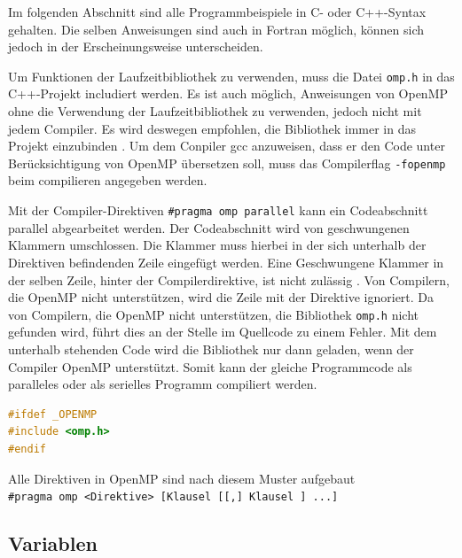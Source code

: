 \documentclass[../main.tex]{subfiles}
\begin{document}
Im folgenden Abschnitt sind alle Programmbeispiele in C- oder C++-Syntax gehalten. Die selben Anweisungen sind auch in Fortran möglich, können sich jedoch in der Erscheinungsweise unterscheiden.

Um Funktionen der Laufzeitbibliothek zu verwenden, muss die Datei \texttt{omp.h} in das C++-Projekt includiert werden. Es ist auch möglich, Anweisungen von OpenMP ohne die Verwendung der Laufzeitbibliothek zu verwenden, jedoch nicht mit jedem Compiler. Es wird deswegen empfohlen, die Bibliothek immer in das Projekt einzubinden \cite{articleOpenMP}. Um dem Conpiler gcc anzuweisen, dass er den Code unter Berücksichtigung von OpenMP übersetzen soll, muss das Compilerflag \texttt{-fopenmp} beim compilieren angegeben werden. \par
Mit der Compiler-Direktiven \texttt{\#pragma\ omp\ parallel} kann ein Codeabschnitt parallel abgearbeitet werden. Der Codeabschnitt wird von geschwungenen Klammern umschlossen. Die Klammer muss hierbei in der sich unterhalb der Direktiven befindenden Zeile eingefügt werden. Eine Geschwungene Klammer in der selben Zeile, hinter der Compilerdirektive, ist nicht zulässig \cite{articleOpenMP}. Von Compilern, die OpenMP nicht unterstützen, wird die Zeile mit der Direktive ignoriert. Da von Compilern, die OpenMP nicht unterstützen, die Bibliothek \texttt{omp.h} nicht gefunden wird, führt dies an der Stelle im Quellcode zu einem Fehler. Mit dem unterhalb stehenden Code wird die Bibliothek nur dann geladen, wenn der Compiler OpenMP unterstützt. Somit kann der gleiche Programmcode als paralleles oder als serielles Programm compiliert werden.
\begin{lstlisting}[language=c++, caption=Includieren der Bibliothek omp.h, captionpos=b, label=listing:include_omp, frame=single, linewidth=\textwidth, breaklines=true]
#ifdef _OPENMP
#include <omp.h>
#endif
\end{lstlisting}
Alle Direktiven in OpenMP sind nach diesem Muster aufgebaut \texttt{\#pragma\ omp\ <Direktive>\ [Klausel\ [[,]\ Klausel\ ]\ ...]}

\subsection{Variablen}
\end{document}

